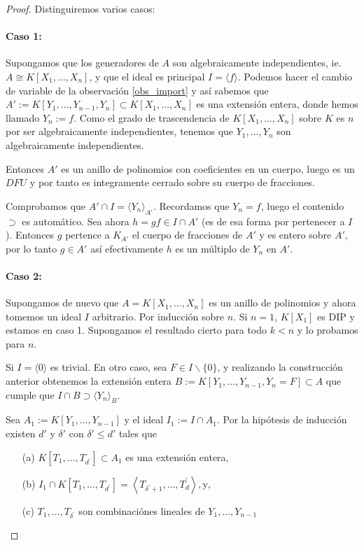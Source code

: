 \documentclass[../main.tex]{subfiles}
\begin{document}
\begin{proof}
Distinguiremos varios casos:

\paragraph{Caso 1:} Supongamos que los generadores de $A$ son algebraicamente independientes, ie. $A\cong K[X_1, \dots, X_n]$, y que el ideal es principal $I = \langle f \rangle$. Podemos hacer el cambio de variable de la observación \ref{obs_import} y así sabemos que $A':= K[Y_1, \dots, Y_{n-1}, Y_n] \subset K[X_1, \dots, X_n]$ es una extensión entera, donde hemos llamado $Y_n := f$. Como el grado de trascendencia de $K[X_1, \dots, X_n]$ sobre $K$ es $n$ por ser algebraicamente independientes, tenemos que $Y_1, \dots, Y_n$ son algebraicamente independientes.

Entonces $A'$ es un anillo de polinomios con coeficientes en un cuerpo, luego es un $DFU$ y por tanto es integramente cerrado sobre su cuerpo de fracciones.

Comprobamos que $A' \cap I = \langle Y_n \rangle_{A'}$. Recordamos que $Y_n = f$, luego el contenido $\supset$ es automático. Sea ahora $h = g f \in I \cap A'$ (es de esa forma por pertenecer a $I$). Entonces $g$ pertence a $K_{A'}$ el cuerpo de fracciones de $A'$ y es entero sobre $A'$, por lo tanto $g \in A'$ así efectivamente $h$ es un múltiplo de $Y_n$ en $A'$.

\paragraph{Caso 2:} Supongamos de nuevo que $A= K[X_1,\dots, X_n]$ es un anillo de polinomios y ahora tomemos un ideal $I$ arbitrario. Por inducción sobre $n$. Si $n=1$, $K[X_1]$ es DIP y estamos en caso 1. Supongamos el resultado cierto para todo $k< n$ y lo probamos para $n$.

Si $I=\langle 0\rangle$ es trivial. En otro caso, sea $F \in I \backslash\{0\}$, y realizando la construcción anterior obtenemos la extensión entera $B:=K\left[Y_{1}, \ldots, Y_{n-1}, Y_{n}=F\right] \subset A$ que cumple que $I \cap B \supset\langle Y_{n}\rangle_{B}$.

Sea $A_{1}:=K[Y_{1}, \ldots, Y_{n-1}]$ y el ideal
$I_{1}:=I \cap A_{1}$. Por la hipótesis de inducción existen $d'$ y $\delta'$ con $\delta' \leq d'$ tales que
\begin{itemize}[]
  \item[(a)] $K\left[T_{1}, \ldots, T_{d^{\prime}}\right] \subset A_{1}$ es una extensión entera,
  \item[(b)] $I_{1} \cap K\left[T_{1}, \ldots, T_{d^{\prime}}\right]=\left\langle T_{\delta^{\prime}+1}, \ldots, T_{d}^{\prime}\right\rangle, \mathrm{y}$,
  \item[(c)] $T_{1}, \ldots, T_{\delta^{\prime}}$ son
  combinaciónes lineales de $Y_{1}, \ldots, Y_{n-1}$
\end{itemize}


\end{proof}
\end{document}
